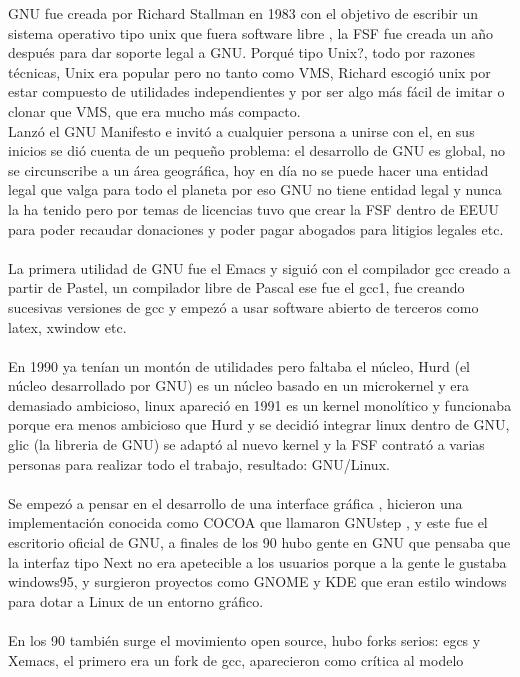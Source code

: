 \documentclass[a4paper,oneside,11pt]{article}
\begin{document}
GNU fue creada por Richard Stallman en 1983 con el objetivo de escribir un sistema operativo tipo unix que fuera software libre , la FSF fue 
creada un año despu\'es para dar soporte legal a GNU. Porqu\'e tipo Unix?, todo por razones t\'ecnicas,
 Unix era popular pero no tanto como VMS,  Richard escogi\'o unix por estar compuesto de utilidades
  independientes y por ser algo m\'as f\'acil de imitar o clonar que VMS, que era mucho m\'as compacto.
\\    
Lanz\'o el GNU Manifesto e invit\'o a cualquier persona a unirse con el, en sus inicios se di\'o cuenta de un pequeño problema: el desarrollo
 de GNU es global, no se circunscribe a un \'area geogr\'afica, hoy en d\'ia no se puede hacer una entidad legal que
  valga para todo el planeta por eso GNU no tiene entidad legal y nunca la ha tenido pero por temas de licencias
   tuvo que crear la FSF dentro de EEUU para poder recaudar donaciones y poder pagar abogados para litigios 
   legales etc.\\
\\
La primera utilidad de GNU fue el Emacs y sigui\'o con el compilador gcc creado a partir de Pastel, un compilador 
libre de Pascal ese fue el gcc1, fue creando sucesivas versiones de gcc y empez\'o a usar software abierto de terceros como latex, xwindow etc.\\
\\
En 1990 ya ten\'ian un mont\'on de utilidades pero faltaba el n\'ucleo, Hurd (el n\'ucleo desarrollado por GNU) es un n\'ucleo basado en un
 microkernel y era demasiado ambicioso, linux apareci\'o en 1991 es un kernel monol\'itico y funcionaba porque 
 era menos ambicioso que Hurd y se decidi\'o integrar linux dentro de GNU, glic (la libreria de GNU) se adapt\'o al nuevo kernel 
 y la FSF contrat\'o a varias personas para realizar todo el trabajo, resultado: GNU/Linux.
\\\\
Se empez\'o a pensar en el desarrollo de una interface gr\'afica , hicieron una
     implementaci\'on conocida como COCOA que llamaron GNUstep , y este fue el escritorio oficial
      de GNU, a finales de los 90 hubo gente en GNU que pensaba que la interfaz tipo Next no era
       apetecible a los usuarios porque a la gente le gustaba windows95,  y surgieron proyectos como GNOME y KDE
       que eran estilo windows para dotar a Linux de un entorno gr\'afico.
 \\\\
En los 90 tambi\'en surge el movimiento open source, 
hubo forks serios: egcs y Xemacs, el primero era un fork de gcc, aparecieron como cr\'itica al modelo
\end{document}

